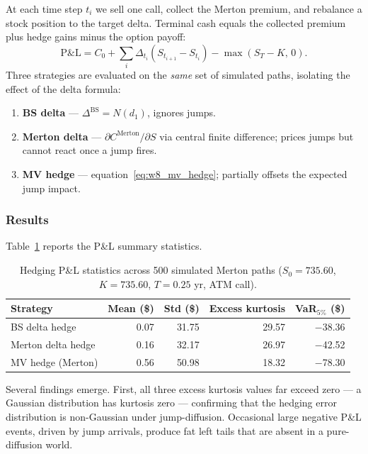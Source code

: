 \documentclass[12pt]{article}
\begin{document}
At each time step $t_i$ we sell one call, collect the Merton premium, and
rebalance a stock position to the target delta.
Terminal cash equals the collected premium plus hedge gains minus the
option payoff:
\[
  \mathrm{P\&L} = C_0
    + \sum_{i} \Delta_{t_i}(S_{t_{i+1}} - S_{t_i})
    - \max(S_T - K,\,0).
\]
Three strategies are evaluated on the \emph{same} set of simulated paths,
isolating the effect of the delta formula:
\begin{enumerate}
  \item \textbf{BS delta} — $\Delta^{\mathrm{BS}} = N(d_1)$, ignores jumps.
  \item \textbf{Merton delta} — $\partial C^{\mathrm{Merton}}/\partial S$
        via central finite difference; prices jumps but cannot react once
        a jump fires.
  \item \textbf{MV hedge} — equation~\eqref{eq:w8_mv_hedge}; partially
        offsets the expected jump impact.
\end{enumerate}

\subsubsection*{Results}

Table~\ref{tab:w8_hedging} reports the P\&L summary statistics.

\begin{table}[h]
\centering
\caption{Hedging P\&L statistics across 500 simulated Merton paths
         ($S_0 = 735.60$, $K = 735.60$, $T = 0.25$ yr, ATM call).}
\label{tab:w8_hedging}
\begin{tabular}{lrrrr}
\hline
Strategy & Mean (\$) & Std (\$) & Excess kurtosis & VaR$_{5\%}$ (\$) \\
\hline
BS delta hedge     & 0.07 & 31.75 & 29.57 & $-$38.36 \\
Merton delta hedge & 0.16 & 32.17 & 26.97 & $-$42.52 \\
MV hedge (Merton)  & 0.56 & 50.98 & 18.32 & $-$78.30 \\
\hline
\end{tabular}
\end{table}

Several findings emerge.
First, all three excess kurtosis values far exceed zero — a Gaussian
distribution has kurtosis zero — confirming that the hedging error
distribution is non-Gaussian under jump-diffusion.
Occasional large negative P\&L events, driven by jump arrivals, produce
fat left tails that are absent in a pure-diffusion world.
\end{document}

